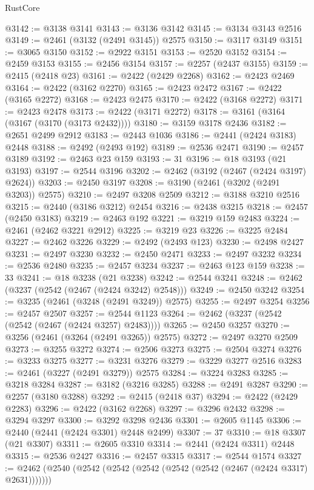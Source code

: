 \begin{lexlean}{RustCore}
\begin{coremodule}
@3142 := @3138 @3141
@3143 := @3136 @3142
@3145 := @3134 @3143 @2516
@3149 := @2461 (@3132 (@2491 @3145)) @2575
@3150 := @3117 @3149
@3151 := @3065 @3150
@3152 := @2922 @3151
@3153 := @2520 @3152
@3154 := @2459 @3153
@3155 := @2456 @3154
@3157 := @2257 (@2437 @3155)
@3159 := @2415 (@2418 @23)
@3161 := @2422 (@2429 @2268)
@3162 := @2423 @2469
@3164 := @2422 (@3162 @2270)
@3165 := @2423 @2472
@3167 := @2422 (@3165 @2272)
@3168 := @2423 @2475
@3170 := @2422 (@3168 @2272)
@3171 := @2423 @2478
@3173 := @2422 (@3171 @2272)
@3178 := @3161 (@3164 (@3167 (@3170 (@3173 @2432))))
@3180 := @3159 @3178 @2436
@3182 := @2651 @2499 @2912
@3183 := @2443 @1036
@3186 := @2441 (@2424 @3183) @2448
@3188 := @2492 (@2493 @192)
@3189 := @2536 @2471
@3190 := @2457 @3189
@3192 := @2463 @23 @159
@3193 := 31
@3196 := @18 @3193 (@21 @3193)
@3197 := @2544 @3196
@3202 := @2462 (@3192 (@2467 (@2424 @3197) @2624))
@3203 := @2450 @3197
@3208 := @3190 (@2461 (@3202 (@2491 @3203)) @2575)
@3210 := @2497 @3208 @2509
@3212 := @3188 @3210 @2516
@3215 := @2440 (@3186 @3212) @2454
@3216 := @2438 @3215
@3218 := @2457 (@2450 @3183)
@3219 := @2463 @192
@3221 := @3219 @159 @2483
@3224 := @2461 (@2462 @3221 @2912)
@3225 := @3219 @23
@3226 := @3225 @2484
@3227 := @2462 @3226
@3229 := @2492 (@2493 @123)
@3230 := @2498 @2427
@3231 := @2497 @3230
@3232 := @2450 @2471
@3233 := @2497 @3232
@3234 := @2536 @2480
@3235 := @2457 @3234
@3237 := @2463 @123 @159
@3238 := 33
@3241 := @18 @3238 (@21 @3238)
@3242 := @2544 @3241
@3248 := @2462 (@3237 (@2542 (@2467 (@2424 @3242) @2548)))
@3249 := @2450 @3242
@3254 := @3235 (@2461 (@3248 (@2491 @3249)) @2575)
@3255 := @2497 @3254
@3256 := @2457 @2507
@3257 := @2544 @1123
@3264 := @2462 (@3237 (@2542 (@2542 (@2467 (@2424 @3257) @2483))))
@3265 := @2450 @3257
@3270 := @3256 (@2461 (@3264 (@2491 @3265)) @2575)
@3272 := @2497 @3270 @2509
@3273 := @3255 @3272
@3274 := @2506 @3273
@3275 := @2504 @3274
@3276 := @3233 @3275
@3277 := @3231 @3276
@3279 := @3229 @3277 @2516
@3283 := @2461 (@3227 (@2491 @3279)) @2575
@3284 := @3224 @3283
@3285 := @3218 @3284
@3287 := @3182 (@3216 @3285)
@3288 := @2491 @3287
@3290 := @2257 (@3180 @3288)
@3292 := @2415 (@2418 @37)
@3294 := @2422 (@2429 @2283)
@3296 := @2422 (@3162 @2268)
@3297 := @3296 @2432
@3298 := @3294 @3297
@3300 := @3292 @3298 @2436
@3301 := @2605 @1145
@3306 := @2440 (@2441 (@2424 @3301) @2448 @2499)
@3307 := 37
@3310 := @18 @3307 (@21 @3307)
@3311 := @2605 @3310
@3314 := @2441 (@2424 @3311) @2448
@3315 := @2536 @2427
@3316 := @2457 @3315
@3317 := @2544 @1574
@3327 := @2462 (@2540 (@2542 (@2542 (@2542 (@2542 (@2542 (@2467 (@2424 @3317) @2631)))))))

\end{coremodule}
\end{lexlean}
